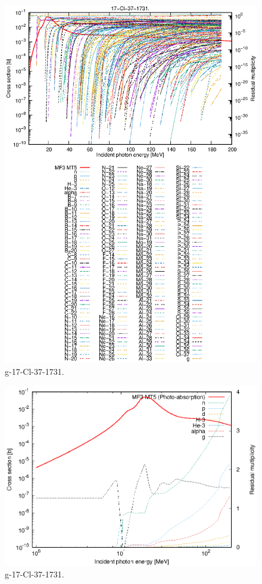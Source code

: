 \begin{figure}
 \includegraphics[width=\linewidth]{eps/g_17-Cl-37_1731.eps}
  \caption{g-17-Cl-37-1731.}
\end{figure}
\newpage \clearpage

\begin{figure}
 \includegraphics[width=\linewidth]{eps-log/g_17-Cl-37_1731.eps}
 \caption{g-17-Cl-37-1731.}
\end{figure}
\newpage \clearpage

